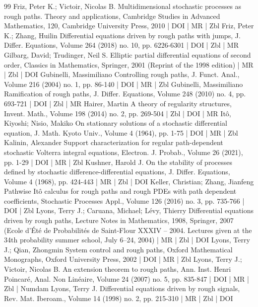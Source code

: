 \documentclass[10pt]{amsart}
\theoremstyle{definition}\newtheorem{defi}[theo]{Definition}\newtheorem{rema}[theo]{Remark}\newtheorem{exam}[theo]{Example}\newtheorem{exem}[theo]{Example}\newtheorem{nota}[theo]{Notation}
\begin{document}
\begin{thebibliography}{99}
Friz, Peter K.; Victoir, Nicolas B. Multidimensional stochastic processes as rough paths. Theory and applications, Cambridge Studies in Advanced Mathematics, 120, Cambridge University Press, 2010 | DOI | MR | Zbl
Friz, Peter K.; Zhang, Huilin Differential equations driven by rough paths with jumps, J. Differ. Equations, Volume 264 (2018) no. 10, pp. 6226-6301 | DOI | Zbl | MR
Gilbarg, David; Trudinger, Neil S. Elliptic partial differential equations of second order, Classics in Mathematics, Springer, 2001 (Reprint of the 1998 edition) | MR | Zbl | DOI
Gubinelli, Massimiliano Controlling rough paths, J. Funct. Anal., Volume 216 (2004) no. 1, pp. 86-140 | DOI | MR | Zbl
Gubinelli, Massimiliano Ramification of rough paths, J. Differ. Equations, Volume 248 (2010) no. 4, pp. 693-721 | DOI | Zbl | MR
Hairer, Martin A theory of regularity structures, Invent. Math., Volume 198 (2014) no. 2, pp. 269-504 | Zbl | DOI | MR
Itô, Kiyoshi; Nisio, Makiko On stationary solutions of a stochastic differential equation, J. Math. Kyoto Univ., Volume 4 (1964), pp. 1-75 | DOI | MR | Zbl
Kalinin, Alexander Support characterization for regular path-dependent stochastic Volterra integral equations, Electron. J. Probab., Volume 26 (2021), pp. 1-29 | DOI | MR | Zbl
Kushner, Harold J. On the stability of processes defined by stochastic difference-differential equations, J. Differ. Equations, Volume 4 (1968), pp. 424-443 | MR | Zbl | DOI
Keller, Christian; Zhang, Jianfeng Pathwise Itô calculus for rough paths and rough PDEs with path dependent coefficients, Stochastic Processes Appl., Volume 126 (2016) no. 3, pp. 735-766 | DOI | Zbl
Lyons, Terry J.; Caruana, Michael; Lévy, Thierry Differential equations driven by rough paths, Lecture Notes in Mathematics, 1908, Springer, 2007 (Ecole d’Été de Probabilités de Saint-Flour XXXIV – 2004. Lectures given at the 34th probability summer school, July 6–24, 2004) | MR | Zbl | DOI
Lyons, Terry J.; Qian, Zhongmin System control and rough paths, Oxford Mathematical Monographs, Oxford University Press, 2002 | DOI | MR | Zbl
Lyons, Terry J.; Victoir, Nicolas B. An extension theorem to rough paths, Ann. Inst. Henri Poincaré, Anal. Non Linéaire, Volume 24 (2007) no. 5, pp. 835-847 | DOI | MR | Zbl | Numdam
Lyons, Terry J. Differential equations driven by rough signals, Rev. Mat. Iberoam., Volume 14 (1998) no. 2, pp. 215-310 | MR | Zbl | DOI

\end{thebibliography}
\end{document}
